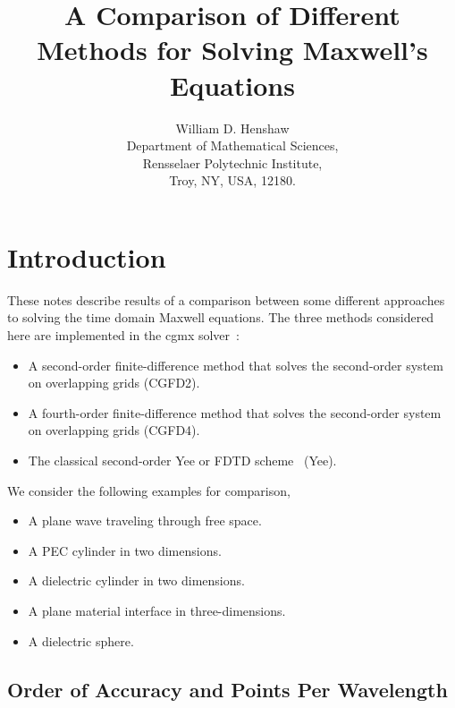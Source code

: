 \documentclass[11pt]{article}
\begin{document}
 
\title{A Comparison of Different Methods for Solving Maxwell's Equations}

\author{
William D. Henshaw  \\
Department of Mathematical Sciences, \\
Rensselaer Polytechnic Institute, \\
Troy, NY, USA, 12180.
}
 
\maketitle

\tableofcontents

\section{Introduction}

These notes describe results of a comparison between some different approaches to 
solving the time domain Maxwell equations.
%
The three methods considered here are implemented in the cgmx solver~\cite{max2006b}:
\begin{itemize}
  \item A second-order finite-difference method that solves the second-order system on overlapping grids (CGFD2).
  \item A fourth-order finite-difference method that solves the second-order system on overlapping grids (CGFD4).
  \item The classical second-order Yee or FDTD scheme~\cite{Taflove2000,Yee66} (Yee).
\end{itemize}

We consider the following examples for comparison,
\begin{itemize}
  \item A plane wave traveling through free space.
  \item A PEC cylinder in two dimensions.
  \item A dielectric cylinder in two dimensions.
  \item A plane material interface in three-dimensions.
  \item A dielectric sphere. 
\end{itemize}

\clearpage
\newcommand{\tol}{\tau}
\subsection{Order of Accuracy and Points Per Wavelength}
\end{document}
